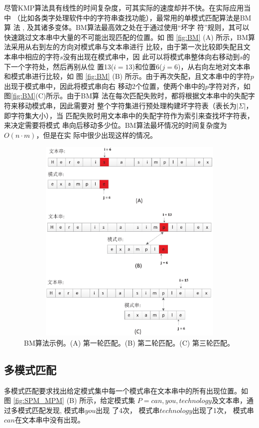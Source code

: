 尽管KMP算法具有线性的时间复杂度，可其实际的速度却并不快。在实际应用当中
（比如各类字处理软件中的字符串查找功能），最常用的单模式匹配算法是BM算
法 \cite{Boyer1977}, 及其诸多变体。BM算法最高效之处在于通过使用“坏字
符”规则，其可以快速跳过文本串中大量的不可能出现匹配的位置。如
图 \ref{fig:BM} (A) 所示，BM算法采用从右到左的方向对模式串与文本串进行
比较，由于第一次比较即失配且文本串中相应的字符$s$没有出现在模式串中，因
此可以将模式串整体向右移动到$s$的下一个字符处，然后再别从位
置13($i=13$)和位置6($j=6$)，从右向左地对文本串和模式串进行比较，如
图 \ref{fig:BM} (B)
所示。由于再次失配，且文本串中的字符$p$出现于模式串中，因此将模式串向右
移动2个位置，使两个串中的$p$字符对齐，如图\ref{fig:BM}(C)所示。由于BM算
法在每次匹配失败时，都将根据文本串中的失配字符来移动模式串，因此需要对
整个字符集进行预处理构建坏字符表（表长为$|\Sigma|$，即字符集大小），当
匹配失败时用文本串中的失配字符作为索引来查找坏字符表，来决定需要将模式
串向后移动多少位。BM算法最坏情况的时间复杂度为$O(n \cdot m)$，但是在实
际中很少出现这样的情况。

\begin{figure}[!h]
  \centering
  \includegraphics[height=10cm ,width=12cm]{figures/1_Introduction/BM.eps}
  \caption{BM算法示例。(A) 第一轮匹配。(B) 第二轮匹配。(C) 第三轮匹配。}
  \label{fig:KMP}
\end{figure}

\subsection{多模式匹配}

多模式匹配要求找出给定模式集中每一个模式串在文本串中的所有出现位置。如
图 \ref{fig:SPM_MPM} (B) 所示，给定模式集
$P={can, you, technology}$及文本串，通过多模式匹配发现, 模式串$you$出现
了4次， 模式串$technology$出现了1次， 模式串$can$在文本串中没有出现。

